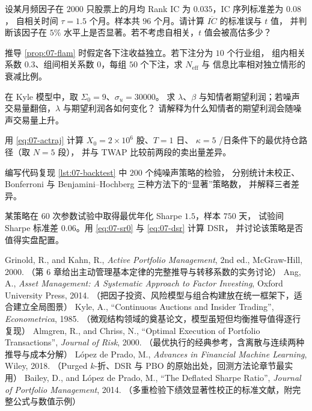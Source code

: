 \begin{exercises}
  \item 设某月频因子在 $2000$ 只股票上的月均 Rank IC 为 $0.035$，IC 序列标准差为 $0.08$，
  自相关时间 $\tau = 1.5$ 个月。样本共 $96$ 个月。请计算 $\overline{IC}$ 的标准误与 $t$ 值，
  并判断该因子在 $5\%$ 水平上是否显著。若不考虑自相关，$t$ 值会被高估多少？
  \item 推导 \cref{prop:07-flam} 时假定各下注收益独立。若下注分为 $10$ 个行业组，
  组内相关系数 $0.3$、组间相关系数 $0$，每组 $50$ 个下注，求 $N_{\text{eff}}$ 与
  信息比率相对独立情形的衰减比例。
  \item 在 Kyle 模型中，取 $\Sigma_0 = 9$、$\sigma_u = 30000$。
  求 $\lambda$、$\beta$ 与知情者期望利润；若噪声交易量翻倍，$\lambda$ 与期望利润各如何变化？
  请解释为什么知情者的期望利润会随噪声交易量上升。
  \item 用 \cref{eq:07-actraj} 计算 $X_0 = 2\times10^{6}$ 股、$T = 1$ 日、
  $\kappa = 5$ /日条件下的最优持仓路径（取 $N = 5$ 段），
  并与 TWAP 比较前两段的卖出量差异。
  \item 编写代码复现 \cref{lst:07-backtest} 中 $200$ 个纯噪声策略的检验，
  分别统计未校正、Bonferroni 与 Benjamini--Hochberg 三种方法下的“显著”策略数，
  并解释三者差异。
  \item 某策略在 $60$ 次参数试验中取得最优年化 Sharpe $1.5$，样本 $750$ 天，
  试验间 Sharpe 标准差 $0.06$。用 \cref{eq:07-sr0} 与 \cref{eq:07-dsr} 计算 DSR，
  并讨论该策略是否值得实盘配置。
\end{exercises}

\begin{furtherreading}
 Grinold, R., and Kahn, R., \emph{Active Portfolio Management}, 2nd ed., McGraw-Hill, 2000.
（第 6 章给出主动管理基本定律的完整推导与转移系数的实务讨论）
 Ang, A., \emph{Asset Management: A Systematic Approach to Factor Investing}, Oxford University Press, 2014.
（把因子投资、风险模型与组合构建放在统一框架下，适合建立全局图景）
 Kyle, A., ``Continuous Auctions and Insider Trading'', \emph{Econometrica}, 1985.
（微观结构领域的奠基论文，模型虽短但均衡推导值得逐行复现）
 Almgren, R., and Chriss, N., ``Optimal Execution of Portfolio Transactions'', \emph{Journal of Risk}, 2000.
（最优执行的经典参考，含离散与连续两种推导与成本分解）
 López de Prado, M., \emph{Advances in Financial Machine Learning}, Wiley, 2018.
（Purged $k$-折、DSR 与 PBO 的原始出处，回测方法论章节最实用）
 Bailey, D., and López de Prado, M., ``The Deflated Sharpe Ratio'', \emph{Journal of Portfolio Management}, 2014.
（多重检验下绩效显著性校正的标准文献，附完整公式与数值示例）
\end{furtherreading}
